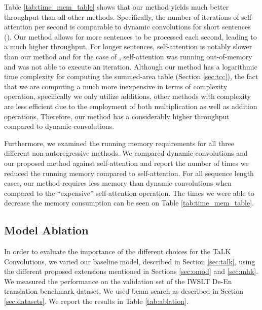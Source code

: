 \documentclass{article}
\def\talkconvfulls{TaLK Convolutions}
\def\iwslt{IWSLT De-En}
\begin{document}
Table \ref{tab:time_mem_table} shows that our method yields much better throughput than all other methods. Specifically, the number of iterations of self-attention per second is comparable to dynamic convolutions for short sentences (). Our method allows for more sentences to be processed each second, leading to a much higher throughput. For longer sentences, self-attention is notably slower than our method and for the case of , self-attention was running out-of-memory and was not able to execute an iteration. Although our method has a logarithmic time complexity for computing the summed-area table (Section \ref{sec:tcc}), the fact that we are computing a much more inexpensive in terms of complexity operation, specifically we only utilize additions, other methods with  complexity are less efficient due to the employment of both multiplication as well as addition operations. Therefore, our method has a considerably higher throughput compared to dynamic convolutions. 

Furthermore, we examined the running memory requirements for all three different non-autoregressive methods. We compared dynamic convolutions and our proposed method against self-attention and report the number of times we reduced the running memory compared to self-attention. For all sequence length cases, our method requires less memory than dynamic convolutions when compared to the ``expensive'' self-attention operation. The times we were able to decrease the memory consumption can be seen on Table \ref{tab:time_mem_table}.

\subsection{Model Ablation}

In order to evaluate the importance of the different choices for the \talkconvfulls{}, we varied our baseline model, described in Section \ref{sec:talk}, using the different proposed extensions mentioned in Sections \ref{sec:omod} and \ref{sec:mhk}. We measured the performance on the validation set of the \iwslt{} translation benchmark dataset. We used beam search as described in Section \ref{sec:datasets}. We report the results in Table \ref{tab:ablation}.
\end{document}
